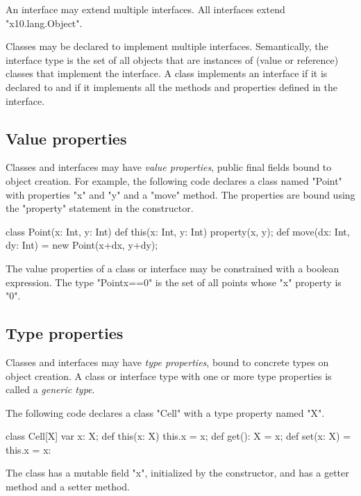         An interface may extend multiple interfaces.
        All interfaces extend \xcd"x10.lang.Object".

Classes may be declared to implement 
multiple interfaces. 
Semantically, the interface type is the set of all objects that are
instances of (value or reference) classes that implement the
interface. A class implements an interface if it is declared to
and if
it implements all the methods and properties defined in the interface.

\subsection{Value properties}


        Classes and interfaces may have {\em value properties},
        public final fields bound to object creation.  
%
        For example, the following code declares a class named
        \xcd"Point" with properties \xcd"x" and \xcd"y"
        and a \xcd"move" method.  The properties are bound
        using the \xcd"property" statement in the constructor.

\begin{xten}
class Point(x: Int, y: Int) {
  def this(x: Int, y: Int) { property(x, y); }
  def move(dx: Int, dy: Int) = new Point(x+dx, y+dy);
}
\end{xten}

        The value properties of a class or interface may be
        constrained with a boolean expression.  The type
        \xcd"Point{x==0}" is the set of all points whose \xcd"x"
        property is \xcd"0".


\iftypeparams
\else

\subsection{Type properties}
\label{TypeProperties}


        Classes and interfaces may have {\em type properties}, bound
        to concrete types on object creation.
        A class or interface type
        with one or more type properties is called a {\em
        generic type}.

The following code declares a class \xcd"Cell" with a type
property named \xcd"X".
\begin{xten}
class Cell[X] {
    var x: X;
    def this(x: X) { this.x = x; }
    def get(): X = x;
    def set(x: X) = { this.x = x: }
}
\end{xten}
The class has a mutable field \xcd"x", initialized by the
constructor, and has a getter method and a setter method.

